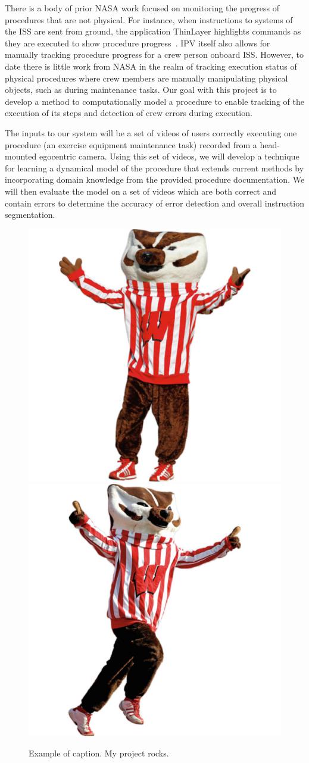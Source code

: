 \documentclass[10pt,letterpaper]{article}
\begin{document}
There is a body of prior NASA work focused on monitoring the progress of procedures that are not physical. For instance, when instructions to systems of the ISS are sent from ground, the application ThinLayer highlights commands as they are executed to show procedure progress~\cite{frank2010plans}. IPV itself also allows for manually tracking procedure progress for a crew person onboard ISS. However, to date there is little work from NASA in the realm of tracking execution status of physical procedures where crew members are manually manipulating physical objects, such as during maintenance tasks. Our goal with this project is to develop a method to computationally model a procedure to enable tracking of the execution of its steps and detection of crew errors during execution.

The inputs to our system will be a set of videos of users correctly executing one procedure (an exercise equipment maintenance task) recorded from a head-mounted egocentric camera. Using this set of videos, we will develop a technique for learning a dynamical model of the procedure that extends current methods by incorporating domain knowledge from the provided procedure documentation. We will then evaluate the model on a set of videos which are both correct and contain errors to determine the accuracy of error detection and overall instruction segmentation.

\begin{figure}[th]
\begin{center}
 \includegraphics[width=0.4\linewidth]{fig/bucky1.jpg} 
\includegraphics[width=0.4\linewidth]{fig/bucky2.jpg}
\end{center}
   \caption{Example of caption.  My project rocks.}
\label{fig:teaser}
 
\end{figure}
\end{document}
